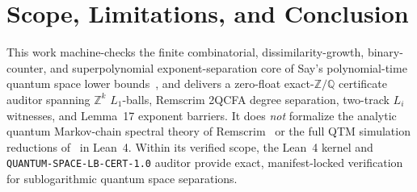 \documentclass[11pt,twocolumn]{article}
\newcommand{\ZZ}{\mathbb{Z}}
\newcommand{\QQ}{\mathbb{Q}}
\begin{document}
\section{Scope, Limitations, and Conclusion}\label{sec:conclusion}
This work machine-checks the finite combinatorial, dissimilarity-growth, binary-counter, and superpolynomial exponent-separation core of Say's polynomial-time quantum space lower bounds~\cite{say2026quantumspace}, and delivers a zero-float exact-$\ZZ/\QQ$ certificate auditor spanning $\ZZ^k$ $L_1$-balls, Remscrim 2QCFA degree separation, two-track $L_i$ witnesses, and Lemma~17 exponent barriers. It does \emph{not} formalize the analytic quantum Markov-chain spectral theory of Remscrim~\cite{remscrim2021lower} or the full QTM simulation reductions of~\cite{say2026quantumspace} in Lean~4. Within its verified scope, the Lean~4 kernel and \texttt{QUANTUM-SPACE-LB-CERT-1.0} auditor provide exact, manifest-locked verification for sublogarithmic quantum space separations.



\end{document}
